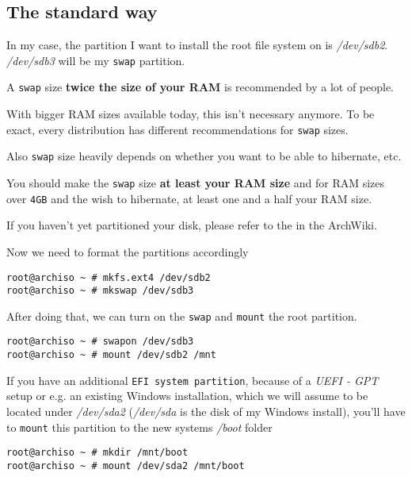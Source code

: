 \documentclass[10pt]{dustdoc}
\begin{document}
\subsection{The standard way}
\label{sec:the-standard-way}

In my case, the partition I want to install the root file system on is \textit{/dev/sdb2}.
\textit{/dev/sdb3} will be my \texttt{swap} partition.

\begin{NOTE}
    A \texttt{swap} size \textbf{twice the size of your RAM} is recommended by a lot of people.

    With bigger RAM sizes available today, this isn’t necessary anymore.
    To be exact, every distribution has different recommendations for \texttt{swap} sizes.

    Also \texttt{swap} size heavily depends on whether you want to be able to hibernate, etc.

    You should make the \texttt{swap} size \textbf{at least your RAM size} and for RAM sizes over \texttt{4GB} and the wish to hibernate, at least one and a half your RAM size.
\end{NOTE}

\begin{IMPORTANT}
    If you haven’t yet partitioned your disk, please refer to the  in the ArchWiki.
\end{IMPORTANT}

Now we need to format the partitions accordingly

\begin{verbatim}
root@archiso ~ # mkfs.ext4 /dev/sdb2
root@archiso ~ # mkswap /dev/sdb3
\end{verbatim}

After doing that, we can turn on the \texttt{swap} and \texttt{mount} the root partition.

\begin{verbatim}
root@archiso ~ # swapon /dev/sdb3
root@archiso ~ # mount /dev/sdb2 /mnt
\end{verbatim}

\begin{NOTE}
    If you have an additional \texttt{EFI system partition}, because of a \emph{UEFI - GPT} setup or e.g. an existing Windows installation, which we will assume to be located under \textit{/dev/sda2} (\textit{/dev/sda} is the disk of my Windows install), you’ll have to \texttt{mount} this partition to the new systems \textit{/boot} folder

    \begin{verbatim}
root@archiso ~ # mkdir /mnt/boot
root@archiso ~ # mount /dev/sda2 /mnt/boot
    \end{verbatim}
\end{NOTE}
\end{document}
